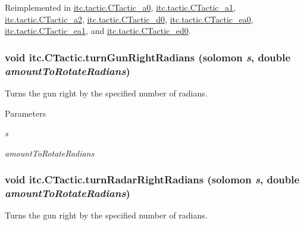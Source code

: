 Reimplemented in \hyperlink{classitc_1_1tactic_1_1_c_tactic__a0_a7d6f39924f332a7ed8c53820a45d3834}{itc.tactic.CTactic\_\-a0}, \hyperlink{classitc_1_1tactic_1_1_c_tactic__a1_a83dba0cef825a91cd2818e3246a77a76}{itc.tactic.CTactic\_\-a1}, \hyperlink{classitc_1_1tactic_1_1_c_tactic__a2_a71e36f42565ca1436eb1ee71f3d94312}{itc.tactic.CTactic\_\-a2}, \hyperlink{classitc_1_1tactic_1_1_c_tactic__d0_a1f8e1863b6d1848867239230dd77b8f8}{itc.tactic.CTactic\_\-d0}, \hyperlink{classitc_1_1tactic_1_1_c_tactic__ea0_af5b367f093ebea65ef06b41b03432289}{itc.tactic.CTactic\_\-ea0}, \hyperlink{classitc_1_1tactic_1_1_c_tactic__ea1_ad3c677f7d3fbb5b88ebac50cd465a3cf}{itc.tactic.CTactic\_\-ea1}, and \hyperlink{classitc_1_1tactic_1_1_c_tactic__ed0_aa8db38d3d879327bb337138a8f42a069}{itc.tactic.CTactic\_\-ed0}.\hypertarget{classitc_1_1_c_tactic_aadc353c46b7efae5844a1803dff12ce7}{
\subsubsection[{turnGunRightRadians}]{\setlength{\rightskip}{0pt plus 5cm}void itc.CTactic.turnGunRightRadians ({\bf solomon} {\em s}, \/  double {\em amountToRotateRadians})}}
\label{classitc_1_1_c_tactic_aadc353c46b7efae5844a1803dff12ce7}
Turns the gun right by the specified number of radians.


\begin{DoxyParams}{Parameters}
\item[{\em s}]\item[{\em amountToRotateRadians}]\end{DoxyParams}
\hypertarget{classitc_1_1_c_tactic_a93bd30da3b2689b475ab0bdc9220ae77}{
\subsubsection[{turnRadarRightRadians}]{\setlength{\rightskip}{0pt plus 5cm}void itc.CTactic.turnRadarRightRadians ({\bf solomon} {\em s}, \/  double {\em amountToRotateRadians})}}
\label{classitc_1_1_c_tactic_a93bd30da3b2689b475ab0bdc9220ae77}
Turns the gun right by the specified number of radians.


